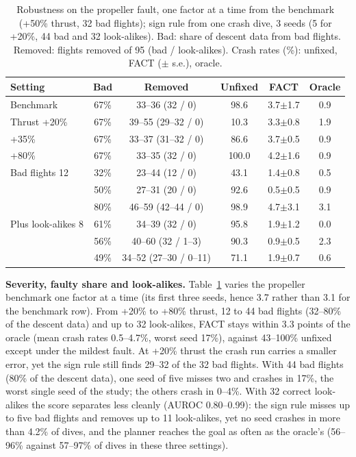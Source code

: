 \documentclass[preprint,12pt]{elsarticle}
\newcommand{\method}{FACT}
\begin{document}
\begin{table}[t]
\caption{Robustness on the propeller fault, one factor at a time from the benchmark (+50\% thrust, 32 bad flights); sign rule from one crash dive, 3 seeds (5 for +20\%, 44 bad and 32 look-alikes). Bad: share of descent data from bad flights. Removed: flights removed of 95 (bad / look-alikes). Crash rates (\%): unfixed, \method{} ($\pm$ s.e.), oracle.}
\label{tab:sweep}
\centering\footnotesize
\setlength{\tabcolsep}{4pt}
\begin{tabular}{@{}lccccc@{}}
\toprule
Setting & Bad & Removed & Unfixed & \method{} & Oracle \\
\midrule
Benchmark & 67\% & 33--36 (32 / 0) & 98.6 & 3.7$\pm$1.7 & 0.9 \\
Thrust +20\% & 67\% & 39--55 (29--32 / 0) & 10.3 & 3.3$\pm$0.8 & 1.9 \\
\quad +35\% & 67\% & 33--37 (31--32 / 0) & 86.6 & 3.7$\pm$0.5 & 0.9 \\
\quad +80\% & 67\% & 33--35 (32 / 0) & 100.0 & 4.2$\pm$1.6 & 0.9 \\
Bad flights 12 & 32\% & 23--44 (12 / 0) & 43.1 & 1.4$\pm$0.8 & 0.5 \\
\quad 20 & 50\% & 27--31 (20 / 0) & 92.6 & 0.5$\pm$0.5 & 0.9 \\
\quad 44 & 80\% & 46--59 (42--44 / 0) & 98.9 & 4.7$\pm$3.1 & 3.1 \\
Plus look-alikes 8 & 61\% & 34--39 (32 / 0) & 95.8 & 1.9$\pm$1.2 & 0.0 \\
\quad 16 & 56\% & 40--60 (32 / 1--3) & 90.3 & 0.9$\pm$0.5 & 2.3 \\
\quad 32 & 49\% & 34--52 (27--30 / 0--11) & 71.1 & 1.9$\pm$0.7 & 0.6 \\
\bottomrule
\end{tabular}
\end{table}

\textbf{Severity, faulty share and look-alikes.} Table~\ref{tab:sweep} varies the propeller benchmark one factor at a time (its first three seeds, hence 3.7 rather than 3.1 for the benchmark row). From +20\% to +80\% thrust, 12 to 44 bad flights (32--80\% of the descent data) and up to 32 look-alikes, \method{} stays within 3.3 points of the oracle (mean crash rates 0.5--4.7\%, worst seed 17\%), against 43--100\% unfixed except under the mildest fault. At +20\% thrust the crash run carries a smaller error, yet the sign rule still finds 29--32 of the 32 bad flights. With 44 bad flights (80\% of the descent data), one seed of five misses two and crashes in 17\%, the worst single seed of the study; the others crash in 0--4\%. With 32 correct look-alikes the score separates less cleanly (AUROC 0.80--0.99): the sign rule misses up to five bad flights and removes up to 11 look-alikes, yet no seed crashes in more than 4.2\% of dives, and the planner reaches the goal as often as the oracle's (56--96\% against 57--97\% of dives in these three settings).
\end{document}
